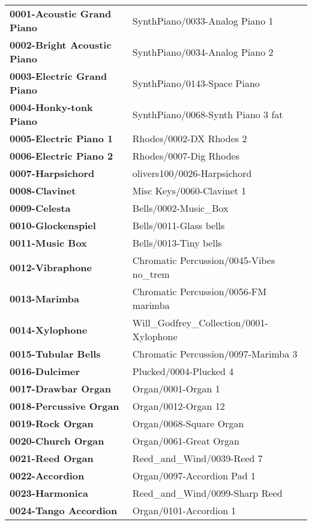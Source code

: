 \begin{longtable}{|l l|}
   \textbf{0001-Acoustic Grand Piano} &
      SynthPiano/0033-Analog Piano 1 \\
   \textbf{0002-Bright Acoustic Piano} &
      SynthPiano/0034-Analog Piano 2 \\
   \textbf{0003-Electric Grand Piano} &
      SynthPiano/0143-Space Piano \\
   \textbf{0004-Honky-tonk Piano} &
      SynthPiano/0068-Synth Piano 3 fat \\
   \textbf{0005-Electric Piano 1} &
      Rhodes/0002-DX Rhodes 2 \\
   \textbf{0006-Electric Piano 2} &
      Rhodes/0007-Dig Rhodes \\
   \textbf{0007-Harpsichord} &
      olivers100/0026-Harpsichord \\
   \textbf{0008-Clavinet} &
      Misc Keys/0060-Clavinet 1 \\
   \textbf{0009-Celesta} &
      Bells/0002-Music\_Box \\
   \textbf{0010-Glockenspiel} &
      Bells/0011-Glass bells \\
   \textbf{0011-Music Box} &
      Bells/0013-Tiny bells \\
   \textbf{0012-Vibraphone} &
      Chromatic Percussion/0045-Vibes no\_trem \\
   \textbf{0013-Marimba} &
      Chromatic Percussion/0056-FM marimba \\
   \textbf{0014-Xylophone} &
      Will\_Godfrey\_Collection/0001-Xylophone \\
   \textbf{0015-Tubular Bells} &
      Chromatic Percussion/0097-Marimba 3 \\
   \textbf{0016-Dulcimer} &
      Plucked/0004-Plucked 4 \\
   \textbf{0017-Drawbar Organ} &
      Organ/0001-Organ 1 \\
   \textbf{0018-Percussive Organ} &
      Organ/0012-Organ 12 \\
   \textbf{0019-Rock Organ} &
      Organ/0068-Square Organ \\
   \textbf{0020-Church Organ} &
      Organ/0061-Great Organ \\
   \textbf{0021-Reed Organ} &
      Reed\_and\_Wind/0039-Reed 7 \\
   \textbf{0022-Accordion} &
      Organ/0097-Accordion Pad 1 \\
   \textbf{0023-Harmonica} &
      Reed\_and\_Wind/0099-Sharp Reed \\
   \textbf{0024-Tango Accordion} &
      Organ/0101-Accordion 1 \\

\end{longtable}
